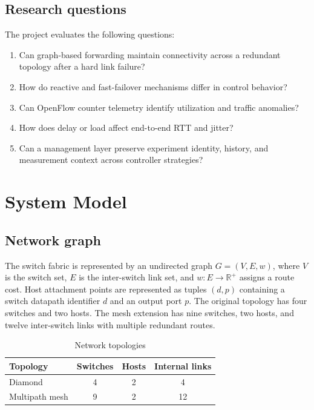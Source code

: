 \documentclass[conference]{IEEEtran}
\begin{document}
\subsection{Research questions}

The project evaluates the following questions:
\begin{enumerate}
\item Can graph-based forwarding maintain connectivity across a redundant
  topology after a hard link failure?
\item How do reactive and fast-failover mechanisms differ in control behavior?
\item Can OpenFlow counter telemetry identify utilization and traffic anomalies?
\item How does delay or load affect end-to-end RTT and jitter?
\item Can a management layer preserve experiment identity, history, and
  measurement context across controller strategies?
\end{enumerate}

\section{System Model}
\label{sec:system}

\subsection{Network graph}

The switch fabric is represented by an undirected graph
$G=(V,E,w)$, where $V$ is the switch set, $E$ is the inter-switch link set,
and $w:E\rightarrow\mathbb{R}^{+}$ assigns a route cost. Host attachment
points are represented as tuples $(d,p)$ containing a switch datapath identifier
$d$ and an output port $p$. The original topology has four switches and two
hosts. The mesh extension has nine switches, two hosts, and twelve
inter-switch links with multiple redundant routes.

\begin{table}[t]
\centering
\caption{Network topologies}
\label{tab:topologies}
\begin{tabular}{lccc}
\toprule
Topology & Switches & Hosts & Internal links\\
\midrule
Diamond & 4 & 2 & 4\\
Multipath mesh & 9 & 2 & 12\\
\bottomrule
\end{tabular}
\end{table}
\end{document}
